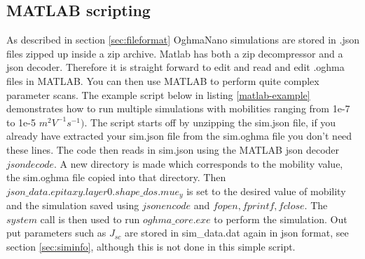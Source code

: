 \newpage
\subsection{MATLAB scripting}
\label{sec:matlabscripts}
As described in section \ref{sec:fileformat} OghmaNano simulations are stored in .json files zipped up inside a zip archive. Matlab has both a zip decompressor and a json decoder.  Therefore it is straight forward to edit and read and edit .oghma files in MATLAB. You can then use MATLAB to perform quite complex parameter scans.  The example script below in listing \ref{matlab-example} demonstrates how to run multiple simulations with mobilities ranging from 1e-7 to 1e-5 $m^{2}V^{-1}s^{-1})$. The script starts off by unzipping the sim.json file, if you already have extracted your sim.json file from the sim.oghma file you don't need these lines. The code then reads in sim.json using the MATLAB json decoder $jsondecode$. A new directory is made which corresponds to the mobility value, the sim.oghma file copied into that directory. Then $json\_data.epitaxy.layer0.shape\_dos.mue_y$ is set to the desired value of mobility and the simulation saved using $jsonencode$ and $fopen,fprintf,fclose$.  The $system$ call is then used to run $oghma\_core.exe$ to perform the simulation. Out put parameters such as $J_{sc}$ are stored in sim\_data.dat again in json format, see section \ref{sec:siminfo}, although this is not done in this simple script.



